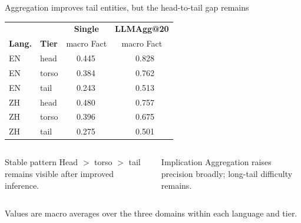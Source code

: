 \documentclass[aspectratio=169,10pt]{beamer}
\newcommand{\pos}[1]{\textcolor{positive}{#1}}
\newcommand{\muted}[1]{\textcolor{neutral}{#1}}
\begin{document}
\begin{frame}{Aggregation improves tail entities, but the head-to-tail gap remains}
  \begin{center}
  \small
  \color{ink}
  \begin{tabular}{@{}llrrrr@{}}
    \toprule
    & & \multicolumn{2}{c}{\textbf{Single}} & \multicolumn{2}{c}{\textbf{LLMAgg@20}}\\
    \textbf{Lang.} & \textbf{Tier} & \multicolumn{2}{c}{macro Fact} & \multicolumn{2}{c}{macro Fact}\\
    \midrule
    EN & head  & \muted{0.445} & & \pos{0.828} & \\
    EN & torso & \muted{0.384} & & \pos{0.762} & \\
    EN & tail  & \muted{0.243} & & \pos{0.513} & \\
    \midrule
    ZH & head  & \muted{0.480} & & \pos{0.757} & \\
    ZH & torso & \muted{0.396} & & \pos{0.675} & \\
    ZH & tail  & \muted{0.275} & & \pos{0.501} & \\
    \bottomrule
  \end{tabular}
  \end{center}
  \vspace{7pt}
  \begin{columns}[T,onlytextwidth]
      \begin{block}{Stable pattern}\small
        Head $>$ torso $>$ tail remains visible after improved inference.
      \end{block}
      \begin{alertblock}{Implication}\small
        Aggregation raises precision broadly; long-tail difficulty remains.
      \end{alertblock}
  \end{columns}
  \vspace{3pt}
  \centering
  {\footnotesize Values are macro averages over the three domains within each language and tier.}
\end{frame}
\end{document}
